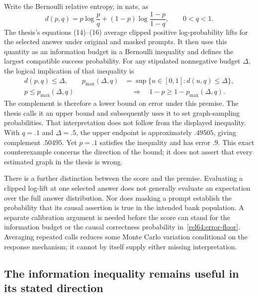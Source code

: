 Write the Bernoulli relative entropy, in nats, as
\[
 d(p,q)=p\log\frac pq+(1-p)\log\frac{1-p}{1-q},
 \qquad 0<q<1.
\]
The thesis's equations (14)--(16) average clipped positive log-probability
lifts for the selected answer under original and masked prompts. It then uses
this quantity as an information budget in a Bernoulli inequality and defines
the largest compatible success probability. For any stipulated nonnegative
budget $\Delta$, the logical implication of that inequality is
\begin{equation}
 \begin{split}
 d(p,q)\leq\Delta,\qquad
 p_{\max}(\Delta,q)&=\sup\{u\in[0,1]:d(u,q)\leq\Delta\},\\
 p\leq p_{\max}(\Delta,q)&\quad\Longrightarrow\quad
 1-p\geq1-p_{\max}(\Delta,q).
 \end{split}
 \label{rel64:error-floor}
\end{equation}
The complement is therefore a lower bound on error under this premise. The
thesis calls it an upper bound and subsequently uses it to set graph-sampling
probabilities. That interpretation does not follow from the displayed
inequality. With $q=.1$ and $\Delta=.5$, the upper endpoint is approximately
$.49505$, giving complement $.50495$. Yet $p=.1$ satisfies the inequality
and has error $.9$. This exact counterexample concerns the direction of the
bound; it does not assert that every estimated graph in the thesis is wrong.
\citep{rel64molero}

There is a further distinction between the score and the premise. Evaluating
a clipped log-lift at one selected answer does not generally evaluate an
expectation over the full answer distribution. Nor does masking a prompt
establish the probability that its causal assertion is true in the intended
bank population. A separate calibration argument is needed before the score
can stand for the information budget or the causal correctness probability
in~\eqref{rel64:error-floor}. Averaging repeated calls reduces some
Monte Carlo variation conditional on the response mechanism; it cannot by
itself supply either missing interpretation.

\subsection{The information inequality remains useful in its stated direction}

